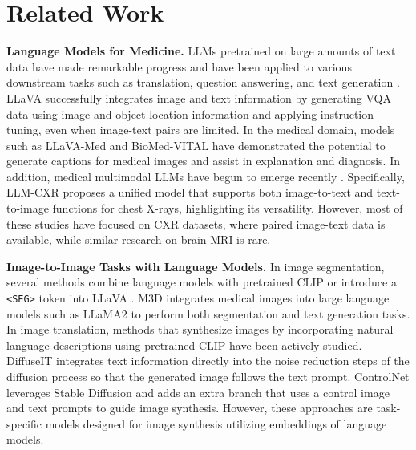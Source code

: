 \section{Related Work}
\noindent \textbf{Language Models for Medicine.} 
LLMs pretrained on large amounts of text data have made remarkable progress and have been applied to various downstream tasks such as translation, question answering, and text generation \cite{achiam2023gpt,team2023gemini,touvron2023llama,touvron2023llama2openfoundation,grattafiori2024llama3herdmodels,ra2025enhancing}. LLaVA \cite{liu2023visual} successfully integrates image and text information by generating VQA data using image and object location information and applying instruction tuning, even when image-text pairs are limited. In the medical domain, models such as LLaVA-Med \cite{li2024llava} and BioMed-VITAL \cite{cui2024biomedical} have demonstrated the potential to generate captions for medical images and assist in explanation and diagnosis. In addition, medical multimodal LLMs have begun to emerge recently \cite{moor2023med,thawkar2023xraygpt,chaves2024towards,lee2025cxr}. Specifically, LLM-CXR \cite{lee2024llmcxr} proposes a unified model that supports both image-to-text and text-to-image functions for chest X-rays, highlighting its versatility. However, most of these studies have focused on CXR datasets, where paired image-text data is available, while similar research on brain MRI is rare.

\vspace{3pt}
\noindent \textbf{Image-to-Image Tasks with Language Models.}
In image segmentation, several methods combine language models with pretrained CLIP \cite{radford2021learning} or introduce a \texttt{<SEG>} token into LLaVA \cite{liu2023visual}. M3D \cite{bai2024m3d} integrates medical images into large language models such as LLaMA2 \cite{touvron2023llama2openfoundation} to perform both segmentation and text generation tasks.
In image translation, methods that synthesize images by incorporating natural language descriptions using pretrained CLIP have been actively studied. DiffuseIT \cite{kwon2023diffusionbased} integrates text information directly into the noise reduction steps of the diffusion process so that the generated image follows the text prompt. ControlNet \cite{zhang2023adding} leverages Stable Diffusion and adds an extra branch that uses a control image and text prompts to guide image synthesis. However, these approaches are task-specific models designed for image synthesis utilizing embeddings of language models. 